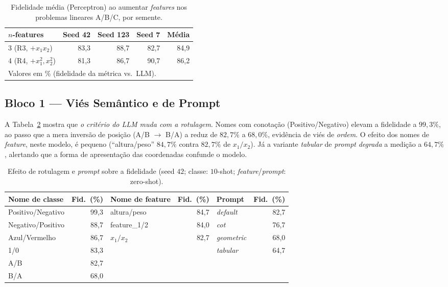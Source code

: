 \documentclass[12pt,a4paper]{article}
\begin{document}
\begin{table}[ht]
\centering
\caption{Fidelidade média (Perceptron) ao aumentar \emph{features} nos problemas lineares
A/B/C, por semente.}
\label{tab:r3r4}
\begin{tabular}{lrrrr}
\toprule
\textbf{$n$-features} & \textbf{Seed 42} & \textbf{Seed 123} & \textbf{Seed 7} &
\textbf{Média} \\
\midrule
3 (R3, $+x_1 x_2$)          & 83,3 & 88,7 & 82,7 & 84,9 \\
4 (R4, $+x_1^2,x_2^2$)      & 81,3 & 86,7 & 90,7 & 86,2 \\
\bottomrule
\multicolumn{5}{l}{\footnotesize Valores em \% (fidelidade da métrica vs.\ LLM).}
\end{tabular}
\end{table}

\subsection{Bloco 1 — Viés Semântico e de Prompt}

A Tabela~\ref{tab:bias} mostra que \emph{o critério do LLM muda com a rotulagem}. Nomes com
conotação (Positivo/Negativo) elevam a fidelidade a $99{,}3\%$, ao passo que a mera inversão
de posição (A/B $\to$ B/A) a reduz de $82{,}7\%$ a $68{,}0\%$, evidência de viés de
\emph{ordem}. O efeito dos nomes de \emph{feature}, neste modelo, é pequeno (``altura/peso''
$84{,}7\%$ contra $82{,}7\%$ de $x_1/x_2$). Já a variante \emph{tabular} de \emph{prompt}
\emph{degrada} a medição a $64{,}7\%$, alertando que a forma de apresentação das coordenadas
confunde o modelo.

\begin{table}[ht]
\centering
\caption{Efeito de rotulagem e \emph{prompt} sobre a fidelidade (seed $42$; classe:
$10$-shot; \emph{feature}/\emph{prompt}: zero-shot).}
\label{tab:bias}
\small
\begin{tabular}{lr@{\hskip 1.2cm}lr@{\hskip 1.2cm}lr}
\toprule
\textbf{Nome de classe} & \textbf{Fid.\ (\%)} &
\textbf{Nome de feature} & \textbf{Fid.\ (\%)} &
\textbf{Prompt} & \textbf{Fid.\ (\%)} \\
\midrule
Positivo/Negativo & 99,3 & altura/peso        & 84,7 & \emph{default}   & 82,7 \\
Negativo/Positivo & 88,7 & feature\_1/2       & 84,0 & \emph{cot}       & 76,7 \\
Azul/Vermelho     & 86,7 & $x_1/x_2$          & 82,7 & \emph{geometric} & 68,0 \\
1/0               & 83,3 &                    &      & \emph{tabular}   & 64,7 \\
A/B               & 82,7 &                    &      &                  &      \\
B/A               & 68,0 &                    &      &                  &      \\
\bottomrule
\end{tabular}
\end{table}
\end{document}
